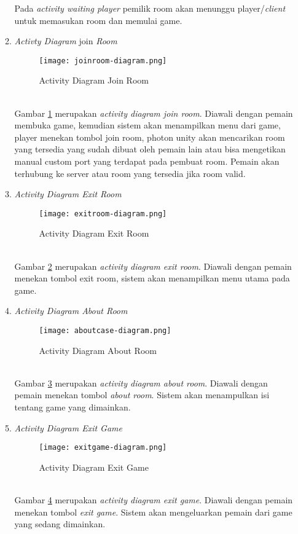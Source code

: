\begin{enumerate}
\begin{enumerate}
       Pada \textit{activity waiting player} pemilik room akan menunggu player/\textit{client} untuk memasukan room dan memulai game.
       \newpage
    \item \textit{Activty Diagram} join \textit{Room}
    \begin{figure}[h]
        \centering
        \texttt{[image: joinroom-diagram.png]}
        \caption{Activity Diagram Join Room}
        \label{fig:jroom-case}
    \end{figure}
    \\ Gambar \ref{fig:jroom-case} merupakan \textit{activity diagram join room}. Diawali dengan pemain membuka game, kemudian sistem akan menampilkan menu dari game, player menekan tombol join room, photon unity akan mencarikan room yang tersedia yang sudah dibuat oleh pemain lain atau bisa mengetikan manual custom port yang terdapat pada pembuat room. Pemain akan terhubung ke server atau room yang tersedia jika room valid.
    \newpage
    \item  \textit{Activity Diagram Exit Room}
    \begin{figure}[h]
        \centering
        \texttt{[image: exitroom-diagram.png]}
        \caption{Activity Diagram Exit Room}
        \label{fig:eroom-case}
    \end{figure}
    \\ Gambar \ref{fig:eroom-case} merupakan \textit{activity diagram exit room}. Diawali dengan pemain menekan tombol exit room, sistem akan menampilkan menu utama pada game.    
    \item \textit{Activity Diagram About Room}
     \begin{figure}[h]
        \centering
        \texttt{[image: aboutcase-diagram.png]}
        \caption{Activity Diagram About Room}
        \label{fig:aroom-case}
    \end{figure}
    \\ Gambar \ref{fig:aroom-case} merupakan \textit{activity diagram about room}. Diawali dengan pemain menekan tombol \textit{about room}. Sistem akan menampulkan isi tentang game yang dimainkan.
    \item  \textit{Activity Diagram Exit Game}
    \begin{figure}[h]
        \centering
        \texttt{[image: exitgame-diagram.png]}
        \caption{Activity Diagram Exit Game}
        \label{fig:egame-case}
    \end{figure}
    \\ Gambar \ref{fig:egame-case} merupakan \textit{activity diagram exit game}. Diawali dengan pemain menekan tombol \textit{exit game}. Sistem akan mengeluarkan pemain dari game yang sedang dimainkan.
\end{enumerate}
\end{enumerate}

